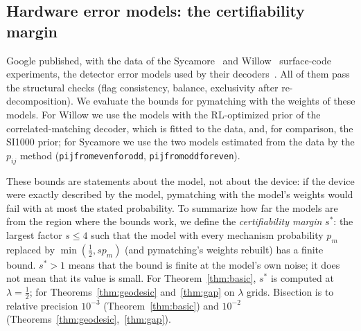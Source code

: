 \documentclass[11pt]{article}
\theoremstyle{plain}
\theoremstyle{definition}
\theoremstyle{remark}
\newcommand{\tsc}[1]{\texttt{#1}}
\renewcommand{\_}{\oldunderscore\allowbreak}
\begin{document}
\subsection{Hardware error models: the certifiability margin}

Google published, with the data of the Sycamore~\cite{Google22} and Willow~\cite{Google24} surface-code experiments, the detector error models used by their decoders~\cite{ZenodoSycamore,ZenodoWillow}. All of them pass the structural checks (flag consistency, balance, exclusivity after re-decomposition). We evaluate the bounds for pymatching with the weights of these models. For Willow we use the models with the RL-optimized prior of the correlated-matching decoder, which is fitted to the data, and, for comparison, the SI1000 prior; for Sycamore we use the two models estimated from the data by the $p_{ij}$ method (\tsc{pij\_from\_even\_for\_odd}, \tsc{pij\_from\_odd\_for\_even}).

These bounds are statements about the model, not about the device: if the device were exactly described by the model, pymatching with the model's weights would fail with at most the stated probability. To summarize how far the models are from the region where the bounds work, we define the \emph{certifiability margin} $s^\ast$: the largest factor $s\le4$ such that the model with every mechanism probability $p_m$ replaced by $\min(\tfrac12,sp_m)$ (and pymatching's weights rebuilt) has a finite bound. $s^\ast>1$ means that the bound is finite at the model's own noise; it does not mean that its value is small. For Theorem~\ref{thm:basic}, $s^\ast$ is computed at $\lambda=\tfrac12$; for Theorems~\ref{thm:geodesic} and~\ref{thm:gap} on $\lambda$ grids. Bisection is to relative precision $10^{-3}$ (Theorem~\ref{thm:basic}) and $10^{-2}$ (Theorems~\ref{thm:geodesic},~\ref{thm:gap}).
\end{document}
